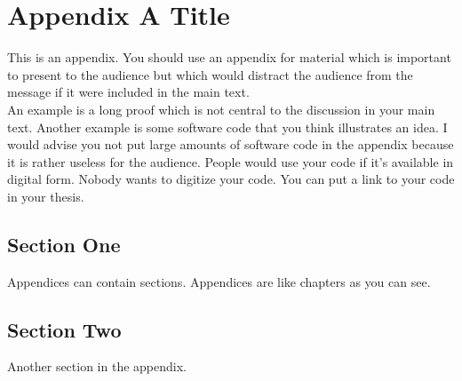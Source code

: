 
\chapter{Appendix A Title}
\label{app:A}

This is an appendix. You should use an appendix for material which is important to 
present to the audience but which would distract the audience from the message 
if it were included in the main text. \\

An example is a long proof which is not central to the discussion in your main text. 
Another example is some software code that you think illustrates an idea. 
I would advise you not put large amounts of software code in the appendix because 
it is rather useless for the audience. People would use your code if it's available 
in digital form. Nobody wants to digitize your code. You can put a link to your 
code in your thesis. 


\section{Section One}
\label{sec:appA:section_one}

Appendices can contain sections. Appendices are like chapters as you can see. 


\section{Section Two}
\label{sec:appA:section_two}

Another section in the appendix.



